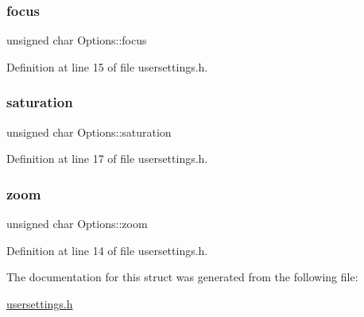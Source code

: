 \subsubsection{\texorpdfstring{focus}{focus}}
{\footnotesize\ttfamily unsigned char Options\+::focus}



Definition at line 15 of file usersettings.\+h.

\mbox{\label{struct_options_a789c6ab9b7f014b3cae84efbf1646e83}} 
\subsubsection{\texorpdfstring{saturation}{saturation}}
{\footnotesize\ttfamily unsigned char Options\+::saturation}



Definition at line 17 of file usersettings.\+h.

\mbox{\label{struct_options_adfa04ac8009b74b40fc38595bc9a2dd0}} 
\subsubsection{\texorpdfstring{zoom}{zoom}}
{\footnotesize\ttfamily unsigned char Options\+::zoom}



Definition at line 14 of file usersettings.\+h.



The documentation for this struct was generated from the following file\+:\begin{DoxyCompactItemize}
\item 
\mbox{\hyperlink{usersettings_8h}{usersettings.\+h}}\end{DoxyCompactItemize}
